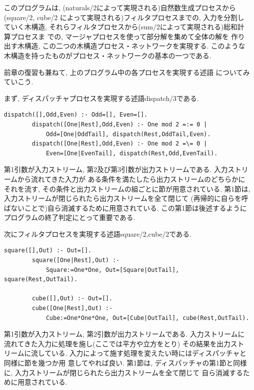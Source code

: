 \documentclass[a4,titlepage]{jsreport}
\newenvironment{program}{\begin{quote}}{\end{quote}}
\begin{document}
このプログラムは, 
(naturals/2によって実現される)自然数生成プロセスから(square/2, cube/2
によって実現される)フィルタプロセスまでの, 入力を分割していく木構造, 
それらフィルタプロセスから(sum/2によって実現される)総和計算プロセスま
での, マージャプロセスを使って部分解を集めて全体の解を
作り出す木構造, この二つの木構造プロセス・ネットワークを実現する.  
このような木構造を持ったものがプロセス・ネットワークの基本の一つである.  

前章の復習も兼ねて, 上のプログラム中の各プロセスを実現する述語
についてみていこう.  

まず, ディスパッチャプロセスを実現する述語dispatch/3である.  
\begin{Verbatim}[baselinestretch=0.8]
        dispatch([],Odd,Even) :- Odd=[], Even=[].
        dispatch([One|Rest],Odd,Even) :- One mod 2 =:= 0 |
            Odd=[One|OddTail], dispatch(Rest,OddTail,Even).
        dispatch([One|Rest],Odd,Even) :- One mod 2 =\= 0 |
            Even=[One|EvenTail], dispatch(Rest,Odd,EvenTail).
\end{Verbatim}

第1引数が入力ストリーム, 第2及び第3引数が出力ストリームである.  
入力ストリームから流れてきた入力が
ある条件を満たしたら出力ストリームのどちらかにそれを流す, 
その条件と出力ストリームの組ごとに節が用意されている.  
第1節は, 入力ストリームが閉じられたら出力ストリームを全て閉じて
(再帰的に自らを呼ばないことで)自ら消滅するために用意されている.  
この第1節は後述するようにプログラムの終了判定にとって重要である.  

次にフィルタプロセスを実現する述語square/2,cube/2である.  

\begin{Verbatim}[baselinestretch=0.8]
        square([],Out) :- Out=[].
        square([One|Rest],Out) :-
            Square:=One*One, Out=[Square|OutTail], square(Rest,OutTail).
        
        cube([],Out) :- Out=[].
        cube([One|Rest],Out) :-
            Cube:=One*One*One, Out=[Cube|OutTail], cube(Rest,OutTail).
\end{Verbatim}

第1引数が入力ストリーム, 第2引数が出力ストリームである.  
入力ストリームに流れてきた入力に処理を施し(ここでは平方や立方をとり)
その結果を出力ストリームに流している.  
入力によって施す処理を変えたい時にはディスパッチャと同様に節を幾つか用
意してやれば良い.  
第1節は, ディスパッチャの第1節と同様に, 
入力ストリームが閉じられたら出力ストリームを全て閉じて
自ら消滅するために用意されている.  
\end{document}
